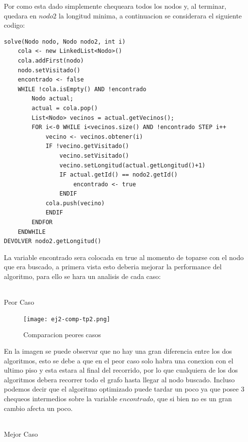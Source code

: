 Por como esta dado simplemente chequeara todos los nodos y, al terminar, quedara en $nodo2$ la longitud minima, a continuacion se considerara el siguiente codigo:

\begin{lstlisting}
solve(Nodo nodo, Nodo nodo2, int i) 
	cola <- new LinkedList<Nodo>()
	cola.addFirst(nodo)
	nodo.setVisitado()
	encontrado <- false
	WHILE !cola.isEmpty() AND !encontrado
        Nodo actual;
        actual = cola.pop()
        List<Nodo> vecinos = actual.getVecinos();		
        FOR i<-0 WHILE i<vecinos.size() AND !encontrado STEP i++ 
            vecino <- vecinos.obtener(i)
            IF !vecino.getVisitado()
                vecino.setVisitado()
                vecino.setLongitud(actual.getLongitud()+1)
                IF actual.getId() == nodo2.getId()
                    encontrado <- true
                ENDIF
            cola.push(vecino)
            ENDIF
     	ENDFOR
    ENDWHILE
DEVOLVER nodo2.getLongitud()
\end{lstlisting}

La variable encontrado sera colocada en true al momento de toparse con el nodo que era buscado, a primera vista esto deberia mejorar la performance del algoritmo, para ello se hara un analisis de cada caso: \\\\

\begin{centering}
Peor Caso \\
\end{centering}

\begin{figure}[h!]
\texttt{[image: ej2-comp-tp2.png]}
\centering
\caption{Comparacion peores casos}
\label{overflow3}
\end{figure}

En la imagen se puede observar que no hay una gran diferencia entre los dos algoritmos, esto se debe a que en el peor caso solo habra una conexion con el ultimo piso y esta estara al final del recorrido, por lo que cualquiera de los dos algoritmos debera recorrer todo el grafo hasta llegar al nodo buscado. Incluso podemos decir que el algoritmo optimizado puede tardar un poco ya que posee $3$ chequeos intermedios sobre la variable $encontrado$, que si bien no es un gran cambio afecta un poco.\\\\

\pagebreak

\begin{centering}
Mejor Caso \\
\end{centering}

